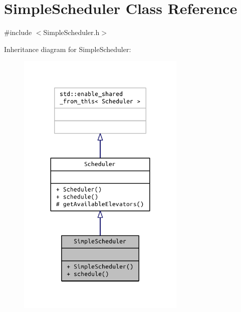 \hypertarget{class_simple_scheduler}{}\section{Simple\+Scheduler Class Reference}
\label{class_simple_scheduler}


{\ttfamily \#include $<$Simple\+Scheduler.\+h$>$}



Inheritance diagram for Simple\+Scheduler\+:
\nopagebreak
\begin{figure}[H]
\begin{center}
\leavevmode
\includegraphics[width=228pt]{class_simple_scheduler__inherit__graph}
\end{center}
\end{figure}


